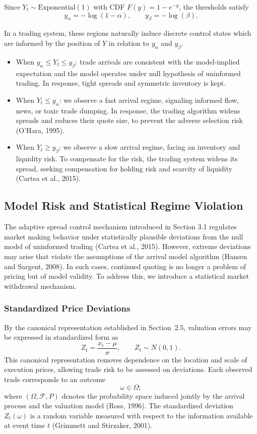 \documentclass[12pt]{article}
\theoremstyle{plain}
\theoremstyle{definition}
\numberwithin{equation}{section}
\begin{document}
Since $Y_t \sim \mathrm{Exponential}(1)$ with CDF $F(y)=1-e^{-y}$, the thresholds satisfy
\begin{equation}
y_\alpha = -\log(1-\alpha), \qquad
y_\beta = -\log(\beta).
\end{equation}

In a trading system, these regions naturally induce discrete control states which are informed by the position of $Y$ in relation to $y_\alpha$ and $y_\beta$.
\begin{itemize}
\item When $y_\alpha \le Y_t   \le y_\beta$:   trade arrivals are consistent with the model-implied expectation and the model operates under null hypothesis of uninformed trading. In response, tight spreads and symmetric inventory is kept.
\item When $Y_t \le y_\alpha$:   we observe a fast arrival regime, signaling informed flow, news,  or toxic trade dumping. In response, the trading algorithm widens spreads and reduces their quote size, to prevent the adverse selection risk (O’Hara, 1995). 
\item When $Y_t \ge y_\beta$:   we observe a slow arrival regime, facing an inventory and liquidity risk. To  compensate for the risk, the trading system widens its spread, seeking compensation for holding risk and scarcity of liquidity (Cartea et al., 2015).
\end{itemize}
\subsection{Model Risk and Statistical Regime Violation}
The adaptive spread control mechanism introduced in Section 3.1 regulates market making behavior under statistically plausible deviations from the null model of uninformed trading (Cartea et al., 2015). However, extreme deviations may arise that violate the assumptions  of the arrival model algorithm (Hansen and Sargent, 2008). In such cases, continued quoting is no longer a problem of pricing but of model validity. To address this, we introduce a statistical market withdrawal mechanism.
\subsubsection{Standardized Price Deviations}
By the canonical representation established in Section~2.5, valuation errors may be
expressed in standardized form as
\begin{equation}
Z_t = \frac{x_i - \mu}{\sigma}, \qquad Z_t \sim N(0,1).
\end{equation}
This canonical representation removes dependence on the location and scale of execution prices, allowing trade risk to be assessed on deviations. Each observed trade corresponds to an outcome
\begin{equation}
\omega \in \Omega;
\end{equation}
where $(\Omega, \mathcal{F}, P)$ denotes the probability space induced jointly by the arrival process and the valuation model (Ross, 1996). The standardized deviation $Z_t(\omega)$ is a random variable measured with respect to the information available at event time $t$ (Grimmett and Stirzaker, 2001).
\end{document}
